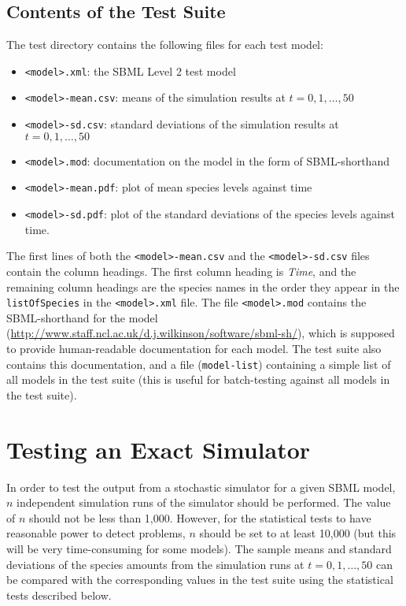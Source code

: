 \documentclass[12pt,a4paper]{article}
\begin{document}
\subsection{Contents of the Test Suite}

The test directory contains the following files for each test model: 
\begin{itemize}
\item \verb$<model>.xml$: the SBML Level 2 test model
\item \verb$<model>-mean.csv$: means of the simulation results at $t = 0,1,\ldots,50$
\item \verb$<model>-sd.csv$: standard deviations of the simulation results at $t = 0,1,\ldots,50$
\item \verb$<model>.mod$: documentation on the model in the form of SBML-shorthand
\item \verb$<model>-mean.pdf$: plot of mean species levels against time 
\item \verb$<model>-sd.pdf$: plot of the standard deviations of the species levels against time. 
\end{itemize}
The first lines of both the \verb$<model>-mean.csv$ and the
\verb$<model>-sd.csv$ files contain the column headings. The first
column heading is \emph{Time}, and the remaining column headings are
the species names in the order they appear in the \verb$listOfSpecies$
in the \verb$<model>.xml$ file. The file \verb$<model>.mod$ contains
the SBML-shorthand for the model
(\url{http://www.staff.ncl.ac.uk/d.j.wilkinson/software/sbml-sh/}),
which is supposed to provide human-readable documentation for each
model. The test suite also contains this documentation, and a file
(\verb$model-list$) containing a simple list of all models in the test
suite (this is useful for batch-testing against all models in the test
suite).

\section{Testing an Exact Simulator}

In order to test the output from a stochastic simulator for a given
SBML model, $n$ independent simulation runs of the simulator should be
performed. The value of $n$ should not be less than 1,000. However,
for the statistical tests to have reasonable power to detect problems,
$n$ should be set to at least 10,000 (but this will be very
time-consuming for some models). The sample means and standard
deviations of the species amounts from the simulation runs at
$t=0,1,\ldots,50$ can be compared with the corresponding values in the
test suite using the statistical tests described below.
\end{document}
